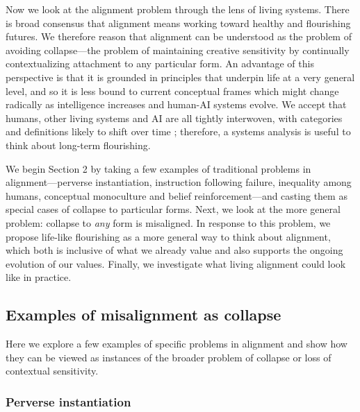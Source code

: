 \documentclass[12pt]{article}
\begin{document}

Now we look at the alignment problem through the lens of living systems. There is broad consensus that alignment means working toward healthy and flourishing futures. We therefore reason that alignment can be understood as the problem of avoiding collapse---the problem of maintaining creative sensitivity by continually contextualizing attachment to any particular form. An advantage of this perspective is that it is grounded in principles that underpin life at a very general level, and so it is less bound to current conceptual frames which might change radically as intelligence increases and human-AI systems evolve. We accept that humans, other living systems and AI are all tightly interwoven, with categories and definitions likely to shift over time \citep{latour2012we, haraway2020staying, hayles2000we, bateson1972steps, folke2006resilience, douglas2012social}; therefore, a systems analysis is useful to think about long-term flourishing.

We begin Section 2 by taking a few examples of traditional problems in alignment---perverse instantiation, instruction following failure, inequality among humans, conceptual monoculture and belief reinforcement---and casting them as special cases of collapse to particular forms. Next, we look at the more general problem: collapse to \textit{any} form is misaligned. In response to this problem, we propose life-like flourishing as a more general way to think about alignment, which both is inclusive of what we already value and also supports the ongoing evolution of our values. Finally, we investigate what living alignment could look like in practice.



\subsection{Examples of misalignment as collapse}

Here we explore a few examples of specific problems in alignment and show how they can be viewed as instances of the broader problem of collapse or loss of contextual sensitivity.

\subsubsection{Perverse instantiation}
\end{document}
